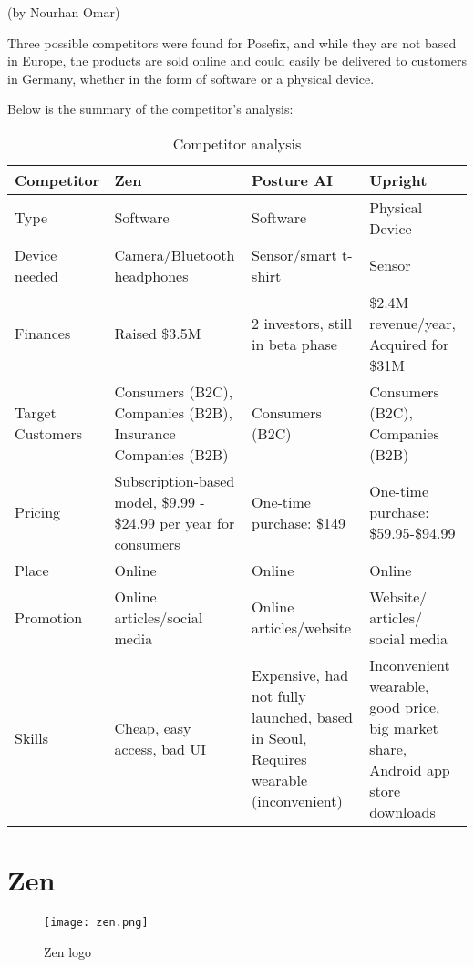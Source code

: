 (by Nourhan Omar)

\p
Three possible competitors were found for Posefix, and while they are not based in Europe, 
the products are sold online and could easily be delivered to customers in Germany, whether in the form of software or a physical device.

\p
Below is the summary of the competitor's analysis:

\begin{table}[ht]
    \centering
    \begin{tabular}{|p{3cm}|p{3cm}|p{3cm}|p{3cm}|}
        \hline
        \textbf{Competitor} & \textbf{Zen} & \textbf{Posture AI} & \textbf{Upright} \\
        \hline
        Type & Software & Software & Physical Device \\
        \hline
        Device needed & Camera/Bluetooth headphones & Sensor/smart t-shirt & Sensor \\
        \hline
        Finances & Raised \$3.5M & 2 investors, still in beta phase & \$2.4M revenue/year, Acquired for \$31M \\
        \hline
        Target Customers & Consumers (B2C), Companies (B2B), Insurance Companies (B2B) & Consumers (B2C) & Consumers (B2C), Companies (B2B) \\
        \hline
        Pricing & Subscription-based model, \$9.99 - \$24.99 per year for consumers & One-time purchase: \$149 & One-time purchase: \$59.95-\$94.99 \\
        \hline
        Place & Online & Online & Online \\
        \hline
        Promotion & Online articles/social media & Online articles/website & Website/ articles/ social media \\
        \hline
        Skills & Cheap, easy access, bad UI & Expensive, had not fully launched, based in Seoul, Requires wearable (inconvenient) & Inconvenient wearable, good price, big market share, Android app store downloads \\
        \hline
    \end{tabular}
    \caption{Competitor analysis}
\end{table}    

\section{Zen}

\begin{figure}[H]
    \centering
    \texttt{[image: zen.png]}
    \caption{Zen logo}
    \label{fig:zen}
\end{figure}

